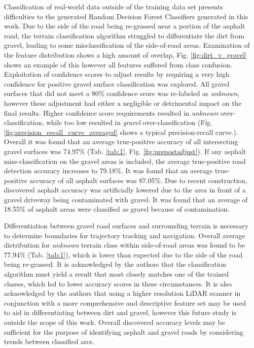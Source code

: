 \documentclass[journal,onecolumn]{IEEEtran}
\begin{document}
		{Classification of real-world data outside of the training data set presents difficulties to the generated Random Decision Forest Classifiers generated in this work. Due to the side of the road being re-grassed near a portion of the asphalt road, the terrain classification algorithm struggled to differentiate the dirt from gravel, leading to some misclassification of the side-of-road areas. Examination of the feature distribution shows a high amount of overlap, Fig. \ref{fig:dirt_v_gravel} shows an example of this however all features suffered from class confusion. Exploitation of confidence scores to adjust results by requiring a very high confidence for positive gravel surface classification was explored. All gravel surfaces that did not meet a 80\% confidence score was re-labeled as \textit{unknown}, however these adjustment had either a negligible or detrimental impact on the final results. Higher confidence score requirements resulted in \textit{unknown} over-classification, while too low resulted in \textit{gravel} over-classification (Fig. \ref{fig:precision_recall_curve_averaged} shows a typical precision-recall curve.). Overall it was found that an average true-positive accuracy of all intersecting gravel surfaces was 74.97\% (Tab. \ref{tab:1}, Fig. \ref{fig:prepostadjust}). If any asphalt miss-classification on the gravel areas is included, the average true-positive road detection accuracy increases to 79.18\%. It was found that an average true-positive accuracy of all asphalt surfaces was 87.05\%. Due to recent construction, discovered asphalt accuracy was artificially lowered due to the area in front of a gravel driveway being contaminated with gravel. It was found that an average of 18.55\% of asphalt areas were classified as gravel because of contamination.}
		
		{Differentiation between gravel road surfaces and surrounding terrain is necessary to determine boundaries for trajectory tracking and navigation. Overall average distribution for \textit{unknown} terrain class within side-of-road areas was found to be 77.94\% (Tab. \ref{tab:1}), which is lower than expected due to the side of the road being re-grassed. It is acknowledged by the authors that the classification algorithm must yield a result that most closely matches one of the trained classes, which led to lower accuracy scores in these circumstances. It is also acknowledged by the authors that using a higher resolution LiDAR scanner in conjunction with a more comprehensive and descriptive feature set may be used to aid in differentiating between dirt and gravel, however this future study is outside the scope of this work. Overall discovered accuracy levels may be sufficient for the purpose of identifying asphalt and gravel roads by considering trends between classified arcs.}
		
\end{document}
